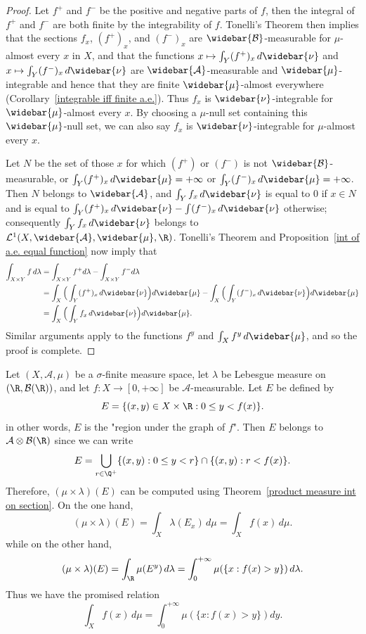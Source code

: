 \begin{proof}
Let $f^+$ and $f^-$ be the positive and negative parts of $f$, then the integral of $f^+$ and $f^-$ are both finite by the integrability of $f$. Tonelli's Theorem then implies that the sections $f_x$, $(f^+)_x$, and $(f^-)_x$ are $\widebar{\mathcal{B}}$-measurable for $\mu$-almost every $x$ in $X$, and that the functions $x\mapsto\int_Y(f^+)_x\,d\widebar{\nu}$ and $x\mapsto\int_Y(f^-)_x\,d\widebar{\nu}$ are $\widebar{\mathcal{A}}$-measurable and $\widebar{\mu}$-integrable and hence that they are finite $\widebar{\mu}$-almost everywhere (Corollary~\ref{integrable iff finite a.e.}). Thus $f_x$ is $\widebar{\nu}$-integrable for $\widebar{\mu}$-almost every $x$. By choosing a $\mu$-null set containing this $\widebar{\mu}$-null set, we can also say $f_x$ is $\widebar{\nu}$-integrable for $\mu$-almost every $x$.\par
Let $N$ be the set of those $x$ for which $(f^+)$ or $(f^-)$ is not $\widebar{\mathcal{B}}$-measurable, or $\int_Y(f^+)_x\,d\widebar{\mu}=+\infty$ or $\int_Y(f^-)_x\,d\widebar{\mu}=+\infty$. Then $N$ belongs to $\widebar{\mathcal{A}}$, and $\int_Yf_x\,d\widebar{\nu}$ is equal to $0$ if $x\in N$ and is equal to $\int_Y(f^+)_x\,d\widebar{\nu}-\int(f^-)_x\,d\widebar{\nu}$ otherwise; consequently $\int_Yf_x\,d\widebar{\nu}$ belongs to $\mathcal{L}^1(X,\widebar{\mathcal{A}},\widebar{\mu},\R)$. Tonelli's Theorem and Proposition~\ref{int of a.e. equal function} now imply that
\begin{align*}
\int_{X\times Y}f\,d\lambda&=\int_{X\times Y}f^+d\lambda-\int_{X\times Y}f^-d\lambda\\
&=\int_{X}\Big(\int_{Y}(f^+)_x\,d\widebar{\nu}\Big)d\widebar{\mu}-\int_{X}\Big(\int_{Y}(f^-)_x\,d\widebar{\nu}\Big)d\widebar{\mu}\\
&=\int_{X}\Big(\int_Yf_x\,d\widebar{\nu}\Big)d\widebar{\mu}.
\end{align*}
Similar arguments apply to the functions $f^y$ and $\int_Xf^y\,d\widebar{\mu}$, and so the proof is complete.
\end{proof}
\begin{example}
Let $(X,\mathcal{A},\mu)$ be a $\sigma$-finite measure space, let $\lambda$ be Lebesgue measure on $(\R,\mathcal{B}(\R))$, and let $f:X\to[0,+\infty]$ be $\mathcal{A}$-measurable. Let $E$ be defined by
\[E=\{(x,y)\in X\times\R:0\leq y<f(x)\}.\]
in other words, $E$ is the "region under the graph of $f$". Then $E$ belongs to $\mathcal{A}\otimes\mathcal{B}(\R)$ since we can write
\[E=\bigcup_{r\in\Q^+}\{(x,y):0\leq y<r\}\cap\{(x,y):r<f(x)\}.\]
Therefore, $(\mu\times\lambda)(E)$ can be computed using Theorem~\ref{product measure int on section}. On the one hand,
\[(\mu\times\lambda)(E)=\int_X\lambda(E_x)\,d\mu=\int_Xf(x)\,d\mu.\]
while on the other hand,
\[(\mu\times\lambda)(E)=\int_{\R}\mu(E^y)\,d\lambda=\int_{0}^{+\infty}\mu(\{x:f(x)>y\})\,d\lambda.\]
Thus we have the promised relation
\[\int_Xf(x)\,d\mu=\int_{0}^{+\infty}\mu(\{x:f(x)>y\})dy.\]
\end{example}
